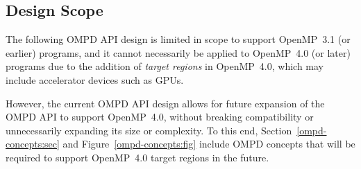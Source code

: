 \subsection{Design Scope}
\label{design-scope:sec}

The following OMPD API design is limited in scope to support
OpenMP~3.1 (or earlier) programs, and it cannot necessarily be applied
to OpenMP~4.0 (or later) programs due to the addition of \emph{target
regions} in OpenMP~4.0, which may include accelerator devices such as
GPUs.

However, the current OMPD API design allows for future
expansion of the OMPD API to support OpenMP~4.0, without breaking
compatibility or unnecessarily expanding its size or complexity.  To
this end, Section~\ref{ompd-concepts:sec} and
Figure~\ref{ompd-concepts:fig} include OMPD concepts that will be
required to support OpenMP~4.0 target regions in the future.
